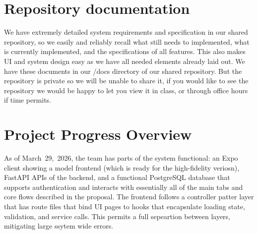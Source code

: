 \documentclass[conference]{IEEEtran}
\begin{document}
\section{Repository documentation}
\label{sec:repo-docs}
We have extremely detailed system requirements and specification in our shared repository, so we easily and reliably recall what still needs to implemented, what is currently implemented, and the specifications of all features. This also makes UI and system design easy as we have all needed elements already laid out. We have these documents in our /docs directory of our shared repository. But the repository is private so we will be unable to share it, if you would like to see the repository we would be happy to let you view it in class, or through office hours if time permits.

\newpage

\section{Project Progress Overview}
As of March~29,~2026, the team has parts of the system functional: an Expo client showing a model frontend (which is ready for the high-fidelity veriosn), FastAPI APIs of the backend, and a functional PostgreSQL database that supports authentication and interacts with essentially all of the main tabs and core flows described in the proposal. The frontend follows a controller patter layer that has route files that bind UI pages to hooks that encapsulate loading state, validation, and service calls. This permits a full sepeartion between layers, mitigating large ssytem wide errors.
\end{document}
